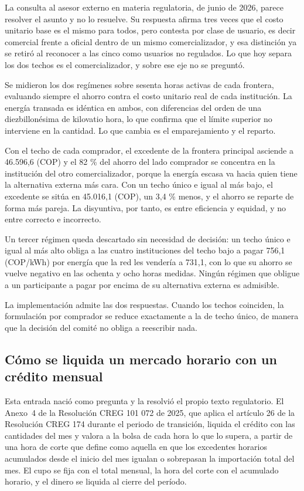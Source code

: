La consulta al asesor externo en materia regulatoria, de junio de 2026,
parece resolver el asunto y no lo resuelve. Su respuesta afirma tres veces
que el costo unitario base es el mismo para todos, pero contesta por clase
de usuario, es decir comercial frente a oficial dentro de un mismo
comercializador, y esa distinción ya se retiró al reconocer a las cinco como
usuarios no regulados. Lo que hoy separa los dos techos es el
comercializador, y sobre ese eje no se preguntó.

Se midieron los dos regímenes sobre sesenta horas activas de cada frontera,
evaluando siempre el ahorro contra el costo unitario real de cada
institución. La energía transada es idéntica en ambos, con diferencias del
orden de una diezbillonésima de kilovatio hora, lo que confirma que el
límite superior no interviene en la cantidad. Lo que cambia es el
emparejamiento y el reparto.

Con el techo de cada comprador, el excedente de la frontera principal
asciende a 46.596,6 (COP) y el 82 \% del ahorro del lado comprador se
concentra en la institución del otro comercializador, porque la energía
escasa va hacia quien tiene la alternativa externa más cara. Con un techo
único e igual al más bajo, el excedente se sitúa en 45.016,1 (COP), un
3,4 \% menos, y el ahorro se reparte de forma más pareja. La disyuntiva, por
tanto, es entre eficiencia y equidad, y no entre correcto e incorrecto.

Un tercer régimen queda descartado sin necesidad de decisión: un techo único
e igual al más alto obliga a las cuatro instituciones del techo bajo a pagar
756,1 (COP/kWh) por energía que la red les vendería a 731,1, con lo que su
ahorro se vuelve negativo en las ochenta y ocho horas medidas. Ningún
régimen que obligue a un participante a pagar por encima de su alternativa
externa es admisible.

La implementación admite las dos respuestas. Cuando los techos coinciden, la
formulación por comprador se reduce exactamente a la de techo único, de
manera que la decisión del comité no obliga a reescribir nada.

\subsection{Cómo se liquida un mercado horario con un crédito mensual}
\label{sub:preg-liquidacion}

Esta entrada nació como pregunta y la resolvió el propio texto regulatorio. El
Anexo~4 de la Resolución CREG 101 072 de 2025, que aplica el artículo 26 de la
Resolución CREG 174 durante el periodo de transición, liquida el crédito con
las cantidades del mes y valora a la bolsa de cada hora lo que lo supera, a
partir de una hora de corte que define como aquella en que los excedentes
horarios acumulados desde el inicio del mes igualan o sobrepasan la
importación total del mes. El cupo se fija con el total mensual, la hora del
corte con el acumulado horario, y el dinero se liquida al cierre del período.

